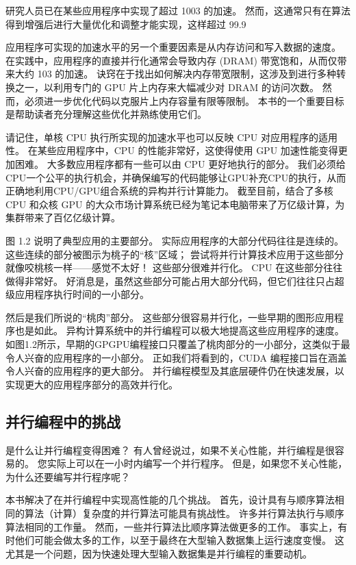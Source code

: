 研究人员已在某些应用程序中实现了超过 1003 的加速。 然而，这通常只有在算法得到增强后进行大量优化和调整才能实现，这样超过 99.9%

应用程序可实现的加速水平的另一个重要因素是从内存访问和写入数据的速度。 在实践中，应用程序的直接并行化通常会导致内存 (DRAM) 带宽饱和，从而仅带来大约 103 的加速。 诀窍在于找出如何解决内存带宽限制，这涉及到进行多种转换之一，以利用专门的 GPU 片上内存来大幅减少对 DRAM 的访问次数。 然而，必须进一步优化代码以克服片上内存容量有限等限制。 本书的一个重要目标是帮助读者充分理解这些优化并熟练使用它们。

请记住，单核 CPU 执行所实现的加速水平也可以反映 CPU 对应用程序的适用性。 在某些应用程序中，CPU 的性能非常好，这使得使用 GPU 加速性能变得更加困难。 大多数应用程序都有一些可以由 CPU 更好地执行的部分。 我们必须给CPU一个公平的执行机会，并确保编写的代码能够让GPU补充CPU的执行，从而正确地利用CPU/GPU组合系统的异构并行计算能力。 截至目前，结合了多核 CPU 和众核 GPU 的大众市场计算系统已经为笔记本电脑带来了万亿级计算，为集群带来了百亿亿级计算。

图 1.2 说明了典型应用的主要部分。 实际应用程序的大部分代码往往是连续的。 这些连续的部分被图示为桃子的“核”区域； 尝试将并行计算技术应用于这些部分就像咬桃核一样——感觉不太好！ 这些部分很难并行化。 CPU 在这些部分往往做得非常好。 好消息是，虽然这些部分可能占用大部分代码，但它们往往只占超级应用程序执行时间的一小部分。

然后是我们所说的“桃肉”部分。 这些部分很容易并行化，一些早期的图形应用程序也是如此。 异构计算系统中的并行编程可以极大地提高这些应用程序的速度。 如图1.2所示，早期的GPGPU编程接口只覆盖了桃肉部分的一小部分，这类似于最令人兴奋的应用程序的一小部分。 正如我们将看到的，CUDA 编程接口旨在涵盖令人兴奋的应用程序的更大部分。 并行编程模型及其底层硬件仍在快速发展，以实现更大的应用程序部分的高效并行化。

\subsection{并行编程中的挑战}
是什么让并行编程变得困难？ 有人曾经说过，如果不关心性能，并行编程是很容易的。 您实际上可以在一小时内编写一个并行程序。 但是，如果您不关心性能，为什么还要编写并行程序呢？

本书解决了在并行编程中实现高性能的几个挑战。 首先，设计具有与顺序算法相同的算法（计算）复杂度的并行算法可能具有挑战性。 许多并行算法执行与顺序算法相同的工作量。 然而，一些并行算法比顺序算法做更多的工作。 事实上，有时他们可能会做太多的工作，以至于最终在大型输入数据集上运行速度变慢。 这尤其是一个问题，因为快速处理大型输入数据集是并行编程的重要动机。


